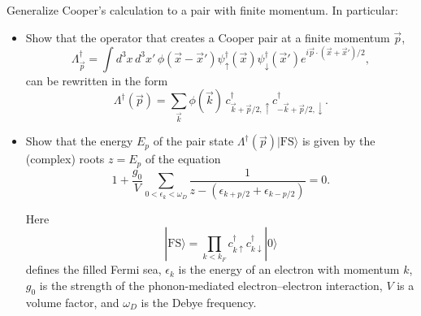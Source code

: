 \begin{Problem}

Generalize Cooper’s calculation to a pair with finite momentum.
In particular:

\begin{itemize}
\item[(a)] Show that the operator that creates a Cooper pair at a finite
momentum \(\vec{p}\),
\[
\Lambda_{\vec{p}}^\dagger
=
\int d^3x\, d^3x'\,
\phi(\vec{x}-\vec{x}')
\psi_\uparrow^\dagger(\vec{x})
\psi_\downarrow^\dagger(\vec{x}')
e^{i\vec{p}\cdot(\vec{x}+\vec{x}')/2},
\tag{9}
\]
can be rewritten in the form
\[
\Lambda^\dagger(\vec{p})
=
\sum_{\vec{k}}
\phi(\vec{k})\,
c_{\vec{k}+\vec{p}/2,\uparrow}^\dagger
c_{-\vec{k}+\vec{p}/2,\downarrow}^\dagger .
\tag{10}
\]

\item[(b)] Show that the energy \(E_p\) of the pair state
\(\Lambda^\dagger(\vec{p})|\mathrm{FS}\rangle\) is given by the (complex)
roots \(z = E_p\) of the equation
\[
1 + \frac{g_0}{V}
\sum_{0 < \epsilon_k < \omega_D}
\frac{1}{z - (\epsilon_{k+p/2} + \epsilon_{k-p/2})}
= 0 .
\tag{11}
\]

Here
\[
|\mathrm{FS}\rangle
=
\prod_{k<k_F}
c_{k\uparrow}^\dagger
c_{k\downarrow}^\dagger
|0\rangle
\]
defines the filled Fermi sea,
\(\epsilon_k\) is the energy of an electron with momentum \(k\),
\(g_0\) is the strength of the phonon-mediated electron--electron interaction,
\(V\) is a volume factor, and \(\omega_D\) is the Debye frequency.
\end{itemize}

\end{Problem}
